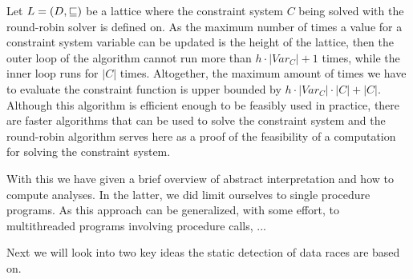 \documentclass[..thesis.tex]{subfiles}
\begin{document}
Let $L = \left( D, \sqsubseteq \right)$ be a lattice where the constraint system $C$ being solved with the round-robin solver is defined on. As the maximum number of times a value for a constraint system variable can be updated is the height of the lattice, then the outer loop of the algorithm cannot run more than $h \cdot \left| Var_C \right| + 1$ times, while the inner loop runs for $\left| C \right|$ times. Altogether, the maximum amount of times we have to evaluate the constraint function is upper bounded by $h \cdot \left| Var_C \right| \cdot \left| C \right| + \left| C \right|$. Although this algorithm is efficient enough to be feasibly used in practice, there are faster algorithms that can be used to solve the constraint system and the round-robin algorithm serves here as a proof of the feasibility of a computation for solving the constraint system.


With this we have given a brief overview of abstract interpretation and how to compute analyses. In the latter, we did limit ourselves to single procedure programs. As this approach can be generalized, with some effort, to multithreaded programs involving procedure calls, ...


Next we will look into two key ideas the static detection of data races are based on.
\end{document}
